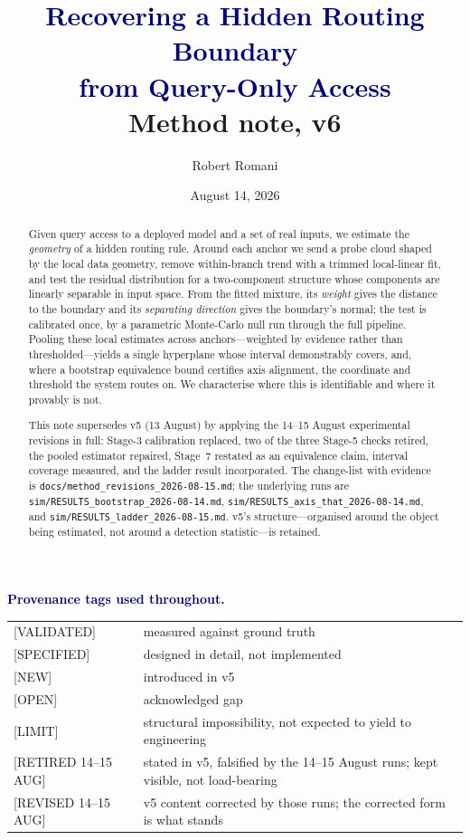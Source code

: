 \documentclass[11pt]{article}
\title{\textcolor{navy}{\sffamily Recovering a Hidden Routing Boundary\\[2pt]
from Query-Only Access}\\[6pt]
\large\normalfont Method note, v6}
\author{Robert Romani}
\date{August 14, 2026}
\newcommand{\provtag}[2]{{\footnotesize\sffamily\textcolor{#1}{[#2]}}}
\newcommand{\VALID}{\provtag{okgreen}{VALIDATED}}
\newcommand{\SPEC}{\provtag{specblue}{SPECIFIED}}
\newcommand{\NEWT}{\provtag{newmag}{NEW}}
\newcommand{\OPENT}{\provtag{openamber}{OPEN}}
\newcommand{\LIMIT}{\provtag{limred}{LIMIT}}
\newcommand{\RETIRED}{\provtag{limred}{RETIRED 14--15 AUG}}
\newcommand{\REVI}{\provtag{openamber}{REVISED 14--15 AUG}}
\begin{document}
\maketitle

\begin{abstract}
\noindent Given query access to a deployed model and a set of real inputs, we estimate the
\emph{geometry} of a hidden routing rule. Around each anchor we send a probe cloud shaped by
the local data geometry, remove within-branch trend with a trimmed local-linear fit, and test
the residual distribution for a two-component structure whose components are linearly separable
in input space. From the fitted mixture, its \emph{weight} gives the distance to the boundary and
its \emph{separating direction} gives the boundary's normal; the test is calibrated once, by a
parametric Monte-Carlo null run through the full pipeline. Pooling these local estimates across
anchors---weighted by evidence rather than thresholded---yields a single hyperplane whose
interval demonstrably covers, and, where a bootstrap equivalence bound certifies axis
alignment, the coordinate and threshold the system routes on. We characterise where this is
identifiable and where it provably is not.

\medskip
\noindent\textcolor{muted}{\small This note supersedes v5 (13 August) by applying the 14--15
August experimental revisions in full: Stage-3 calibration replaced, two of the three Stage-5
checks retired, the pooled estimator repaired, Stage~7 restated as an equivalence claim,
interval coverage measured, and the ladder result incorporated. The change-list with evidence
is \texttt{docs/method\_revisions\_2026-08-15.md}; the underlying runs are
\texttt{sim/RESULTS\_bootstrap\_2026-08-14.md}, \texttt{sim/RESULTS\_axis\_that\_2026-08-14.md},
and \texttt{sim/RESULTS\_ladder\_2026-08-15.md}. v5's structure---organised around the object
being estimated, not around a detection statistic---is retained.}
\end{abstract}

\noindent\textbf{\sffamily\small\textcolor{navy}{Provenance tags used throughout.}}
\smallskip

{\small
\begin{tabular}{@{}ll@{}}
\VALID & measured against ground truth\\
\SPEC & designed in detail, not implemented\\
\NEWT & introduced in v5\\
\OPENT & acknowledged gap\\
\LIMIT & structural impossibility, not expected to yield to engineering\\
\RETIRED & stated in v5, falsified by the 14--15 August runs; kept visible, not load-bearing\\
\REVI & v5 content corrected by those runs; the corrected form is what stands\\
\end{tabular}}
\end{document}
